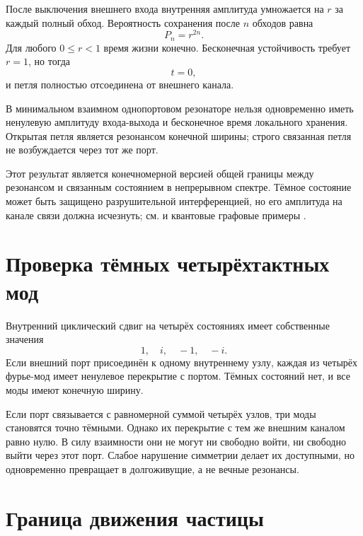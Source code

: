 После выключения внешнего входа внутренняя амплитуда умножается на $r$ за
каждый полный обход. Вероятность сохранения после $n$ обходов равна
\begin{equation}
 P_n=r^{2n}.
 \label{eq:v5-ring-survival}
\end{equation}
Для любого $0\le r<1$ время жизни конечно. Бесконечная устойчивость
требует $r=1$, но тогда
\begin{equation}
 t=0,
\end{equation}
и петля полностью отсоединена от внешнего канала.

\begin{nogocriterion}
В минимальном взаимном однопортовом резонаторе нельзя одновременно иметь
ненулевую амплитуду входа-выхода и бесконечное время локального хранения.
Открытая петля является резонансом конечной ширины; строго связанная петля
не возбуждается через тот же порт.
\end{nogocriterion}

Этот результат является конечномерной версией общей границы между
резонансом и связанным состоянием в непрерывном спектре. Тёмное состояние
может быть защищено разрушительной интерференцией, но его амплитуда на
канале связи должна исчезнуть; см.  и квантовые
графовые примеры .

\section{Проверка тёмных четырёхтактных мод}

Внутренний циклический сдвиг на четырёх состояниях имеет собственные
значения
\begin{equation}
 1,\quad i,\quad-1,\quad-i.
\end{equation}
Если внешний порт присоединён к одному внутреннему узлу, каждая из четырёх
фурье-мод имеет ненулевое перекрытие с портом. Тёмных состояний нет, и все
моды имеют конечную ширину.

Если порт связывается с равномерной суммой четырёх узлов, три моды
становятся точно тёмными. Однако их перекрытие с тем же внешним каналом
равно нулю. В силу взаимности они не могут ни свободно войти, ни свободно
выйти через этот порт. Слабое нарушение симметрии делает их доступными, но
одновременно превращает в долгоживущие, а не вечные резонансы.

\section{Граница движения частицы}


